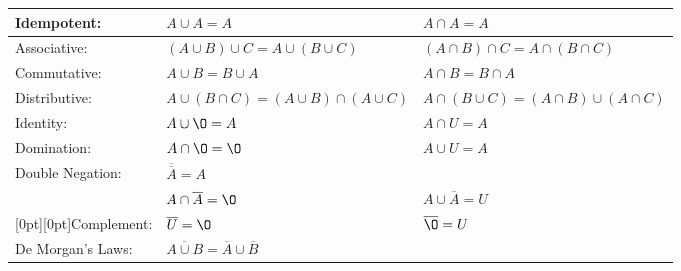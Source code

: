 \noindent
\begin{tabular}{|p{2cm}|l|l|}
    \hline
    \cellcolor{OliveGreen!10} Idempotent:                                            & $A\cup A= A$                                                    & $A\cap A= A$                                 \\
    \hline
    \cellcolor{OliveGreen!10} Associative:                                           & $(A\cup B) \cup C = A \cup (B \cup C)$                          &
    $(A\cap B) \cap C = A \cap (B\cap C)$                                                                                                                                                             \\
    \hline
    \cellcolor{OliveGreen!10} Commutative:                                           & $A\cup B= B \cup A$                                             & $A\cap B = B \cap A$                         \\
    \hline
    \cellcolor{OliveGreen!10} Distributive:                                          & $A\cup (B\cap C) = (A\cup B) \cap (A\cup C)$                    & $A\cap (B\cup C) = (A\cap B) \cup (A\cap C)$ \\
    \hline
    \cellcolor{OliveGreen!10} Identity:                                              & $A\cup \O = A$                                                  & $A\cap U= A$                                 \\
    \hline
    \cellcolor{OliveGreen!10} Domination:                                            & $A\cap \O = \O$                                                 & $A\cup U=A$                                  \\
    \hline
    \cellcolor{OliveGreen!10} Double Negation:                                       & \multicolumn{2}{l|}{$\overline{\overline{A}}=A$}                                                               \\
    \hline
    \cellcolor{OliveGreen!10}\multirow{2}{*}                                         & $A\cap \overline{A} = \O$                                       & $A\cup \overline{A} = U$                     \\
    \cellcolor{OliveGreen!10}\raisebox{.8\normalbaselineskip}[0pt][0pt]{Complement:} & $\overline{U} = \O$                                             & $\overline{\O} = U$                          \\
    \hline
    \cellcolor{OliveGreen!10} De Morgan's Laws:                                      & $\overline{A\cup B} =  \overline{A} \cup \overline{B}$          &

\end{tabular}
